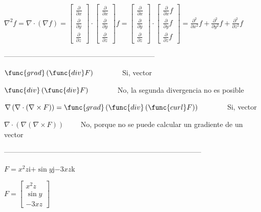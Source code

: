 \documentclass{article}
\begin{document}
$\nabla ^{2}f=\nabla \cdot \left( \nabla f\right) =\left[ 
\begin{array}{c}
\frac{\partial }{\partial x} \\ 
\frac{\partial }{\partial y} \\ 
\frac{\partial }{\partial z}%
\end{array}%
\right] \cdot \left[ 
\begin{array}{c}
\frac{\partial }{\partial x} \\ 
\frac{\partial }{\partial y} \\ 
\frac{\partial }{\partial z}%
\end{array}%
\right] f=\left[ 
\begin{array}{c}
\frac{\partial }{\partial x} \\ 
\frac{\partial }{\partial y} \\ 
\frac{\partial }{\partial z}%
\end{array}%
\right] \cdot \left[ 
\begin{array}{c}
\frac{\partial }{\partial x}f \\ 
\frac{\partial }{\partial y}f \\ 
\frac{\partial }{\partial z}f%
\end{array}%
\right] =\frac{\partial ^{2}}{\partial x^{2}}f+\frac{\partial ^{2}}{\partial
y^{2}}f+\frac{\partial ^{2}}{\partial z^{2}}f$

---------------------------------------------------------------

$\func{grad}\left( \func{div}F\right) \qquad \qquad $Si, vector

$\func{div}\left( \func{div}F\right) \qquad \qquad $No, la segunda
divergencia no es posible

$\nabla \left( \nabla \cdot \left( \nabla \times F\right) \right) =\func{grad%
}\left( \func{div}\left( \func{curl}F\right) \right) \qquad \qquad $Si,
vector

$\nabla \cdot \left( \nabla \left( \nabla \times F\right) \right) \qquad $%
No, porque no se puede calcular un gradiente de un vector

-----------------------------------------------------------------------------------

$F=x^{2}z$i$+\sin y$j$-3xz$k

$F=\left[ 
\begin{array}{c}
x^{2}z \\ 
\sin y \\ 
-3xz%
\end{array}%
\right] $
\end{document}
